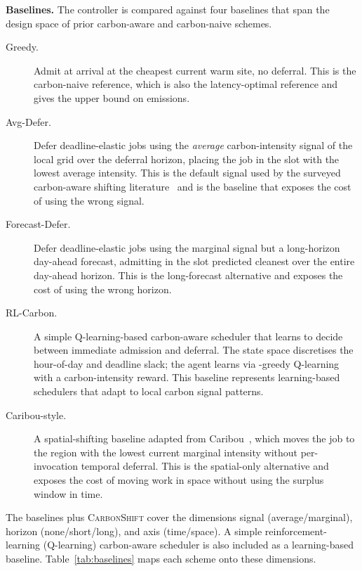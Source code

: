 \textbf{Baselines.}
The controller is compared against four baselines that span the design space of prior carbon-aware and carbon-naive schemes.
\begin{description}
\item[Greedy.] Admit at arrival at the cheapest current warm site, no deferral. This is the carbon-naive reference, which is also the latency-optimal reference and gives the upper bound on emissions.
\item[Avg-Defer.] Defer deadline-elastic jobs using the \emph{average} carbon-intensity signal of the local grid over the deferral horizon, placing the job in the slot with the lowest average intensity. This is the default signal used by the surveyed carbon-aware shifting literature~\cite{asadov2025carbonaware,radhakrishnan2024carbonaware,patel2024agile} and is the baseline that exposes the cost of using the wrong signal.
\item[Forecast-Defer.] Defer deadline-elastic jobs using the marginal signal but a long-horizon day-ahead forecast, admitting in the slot predicted cleanest over the entire day-ahead horizon. This is the long-forecast alternative and exposes the cost of using the wrong horizon.
\item[RL-Carbon.] A simple Q-learning-based carbon-aware scheduler that learns to decide between immediate admission and deferral. The state space discretises the hour-of-day and deadline slack; the agent learns via \epsilon-greedy Q-learning with a carbon-intensity reward. This baseline represents learning-based schedulers that adapt to local carbon signal patterns.\n\item[Caribou-style.] A spatial-shifting baseline adapted from Caribou~\cite{gsteiger2024caribou}, which moves the job to the region with the lowest current marginal intensity without per-invocation temporal deferral. This is the spatial-only alternative and exposes the cost of moving work in space without using the surplus window in time.
\end{description}
The baselines plus \textsc{CarbonShift} cover the dimensions signal (average/marginal), horizon (none/short/long), and axis (time/space). A simple reinforcement-learning (Q-learning) carbon-aware scheduler is also included as a learning-based baseline. Table~\ref{tab:baselines} maps each scheme onto these dimensions.

